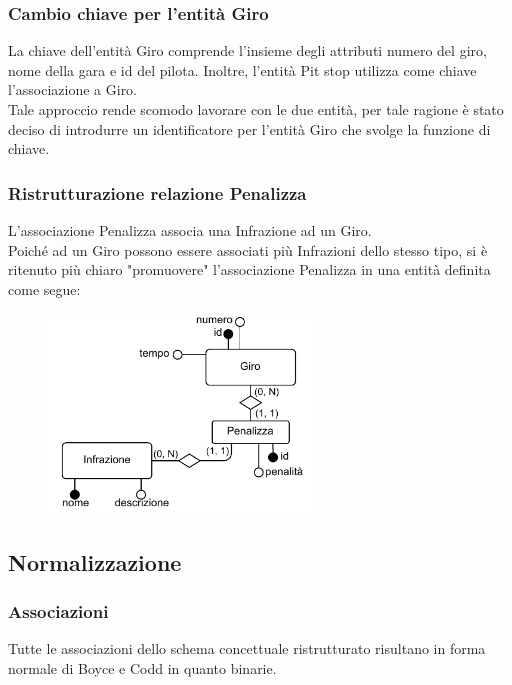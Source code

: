 \documentclass[11pt]{article}
\begin{document}
\subsubsection{Cambio chiave per l'entità Giro}
La chiave dell'entità Giro comprende l'insieme degli attributi numero del giro, nome della gara e id del pilota. Inoltre, l'entità Pit stop utilizza come chiave l'associazione a Giro.\\
Tale approccio rende scomodo lavorare con le due entità, per tale ragione è stato deciso di introdurre un identificatore per l'entità Giro che svolge la funzione di chiave.

\subsubsection{Ristrutturazione relazione Penalizza}
L'associazione Penalizza associa una Infrazione ad un Giro.\\
Poiché ad un Giro possono essere associati più Infrazioni dello stesso tipo, si è ritenuto più chiaro "promuovere" l'associazione Penalizza in una entità definita come segue:

\begin{figure}[H]
    \centering
    \includegraphics[width=7cm]{../er/penalizza.pdf}
\end{figure}

\subsection{Normalizzazione}

\subsubsection{Associazioni}
Tutte le associazioni dello schema concettuale ristrutturato risultano in forma normale di Boyce e Codd in quanto binarie.
\end{document}
